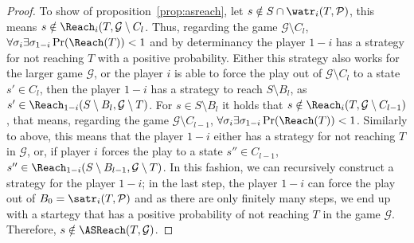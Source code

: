 \begin{proof}
To show \say{$\supseteq$} of proposition~\ref{prop:asreach}, let $s\notin S\cap\watr_i(T, \mathcal{P})$, this means $s\notin\Reach_i(T, \mathcal{G}\setminus C_l$. Thus, regarding the game $\mathcal{G}\setminus C_l$, $\forall\sigma_i\exists\sigma_{1-i}\Pr(\Reach(T))<1$ and by determinancy the player $1-i$ has a strategy for not reaching $T$ with a positive probability. Either this strategy also works for the larger game $\mathcal{G}$, or the player $i$ is able to force the play out of $\mathcal{G}\setminus C_l$ to a state $s'\in C_l$, then the player $1-i$ has a strategy to reach $S\setminus B_l$, as $s'\in\Reach_{1-i}(S\setminus B_l, \mathcal{G}\setminus T)$. For $s\in S\setminus B_l$ it holds that $s\notin\Reach_i(T, \mathcal{G}\setminus C_{l-1})$, that means, regarding the game $\mathcal{G}\setminus C_{l-1}$, $\forall\sigma_i\exists\sigma_{1-i}\Pr(\Reach(T))<1$. Similarly to above, this means that the player $1-i$ either has a strategy for not reaching $T$ in $\mathcal{G}$, or, if player $i$ forces the play to a state $s''\in C_{l-1}$, $s''\in\Reach_{1-i}(S\setminus B_{l-1}, \mathcal{G}\setminus T)$. In this fashion, we can recursively construct a strategy for the player $1-i$; in the last step, the player $1-i$ can force the play out of $B_0=\satr_i(T, \mathcal{P})$ and as there are only finitely many steps, we end up with a startegy that has a positive probability of not reaching $T$ in the game $\mathcal{G}$. Therefore, $s\notin\ASReach(T, \mathcal{G})$.
\end{proof}